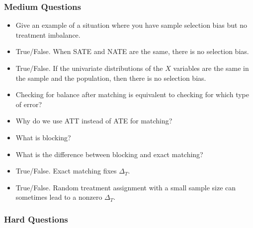 \documentclass[11pt]{article}
\begin{document}
\subsubsection{Medium Questions}


\begin{itemize}

\item Give an example of a situation where you have sample selection bias but no treatment imbalance.

\item True/False.  When SATE and NATE are the same, there is no selection bias.

\item True/False.  If the univariate distributions of the $X$ variables are the same in the sample and the population, then there is no selection bias.
 
\item Checking for balance after matching is equivalent to checking for which type of error?

\item Why do we use ATT instead of ATE for matching?

\item What is blocking?

\item What is the difference between blocking and exact matching?

\item True/False.  Exact matching fixes $\Delta_T$.

\item True/False.  Random treatment assignment with a small sample size can sometimes lead to a nonzero $\Delta_T$.

\end{itemize}

\subsubsection{Hard Questions}
\end{document}

